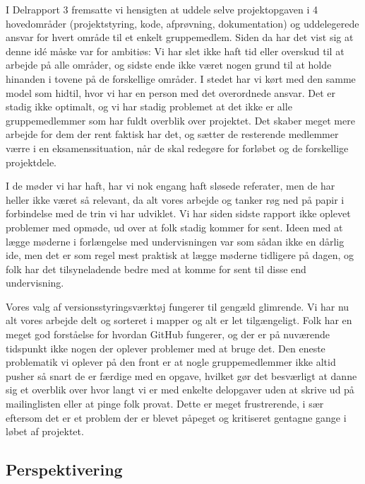 \documentclass[10pt,a4paper,danish]{article}
\begin{document}
I Delrapport 3 fremsatte vi hensigten at uddele selve projektopgaven i 4 hovedområder
(projektstyring, kode, afprøvning, dokumentation) og uddelegerede ansvar for hvert 
område til et enkelt gruppemedlem. Siden da har det vist sig at denne idé måske var
for ambitiøs: Vi har slet ikke haft tid eller overskud til at arbejde på alle områder, 
og sidste ende ikke været nogen grund til at holde hinanden i tovene på de forskellige
områder. I stedet har vi kørt med den samme model som hidtil, hvor vi har en person med 
det overordnede ansvar. Det er stadig ikke optimalt, og vi har stadig problemet at det 
ikke er alle gruppemedlemmer som har fuldt overblik over projektet.
Det skaber meget mere arbejde for dem der rent faktisk har det,
og sætter de resterende medlemmer værre i en eksamenssituation, når de
skal redegøre for forløbet og de forskellige projektdele.

I de møder vi har haft, har vi nok engang haft sløsede referater, men de har
heller ikke været så relevant, da alt vores arbejde og tanker røg ned på papir
i forbindelse med de trin vi har udviklet. Vi har
siden sidste rapport ikke oplevet problemer med opmøde, ud over at folk stadig
kommer for sent. Ideen med at lægge møderne i forlængelse med undervisningen
var som sådan ikke en dårlig ide, men det er som regel mest praktisk at lægge
møderne tidligere på dagen, og folk har det tilsyneladende bedre med at komme
for sent til disse end undervisning. 

Vores valg af versionsstyringsværktøj fungerer til gengæld glimrende. Vi har nu alt vores
arbejde delt og sorteret i mapper og alt er let tilgængeligt. Folk har en meget
god forståelse for hvordan GitHub fungerer, og der er på nuværende tidspunkt ikke
nogen der oplever problemer med at bruge det. Den eneste problematik vi oplever 
på den front er at nogle gruppemedlemmer ikke altid pusher så snart de er færdige 
med en opgave, hvilket gør det besværligt at danne sig et overblik over hvor langt 
vi er med enkelte delopgaver uden at skrive ud på mailinglisten eller at pinge folk
provat. Dette er meget frustrerende, i sær eftersom det er et problem der er blevet
påpeget og kritiseret gentagne gange i løbet af projektet. 

\subsection{Perspektivering}
\end{document}
